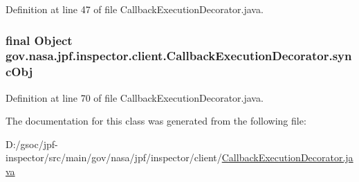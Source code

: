 Definition at line 47 of file Callback\+Execution\+Decorator.\+java.

\subsubsection[{\texorpdfstring{sync\+Obj}{syncObj}}]{\setlength{\rightskip}{0pt plus 5cm}final Object gov.\+nasa.\+jpf.\+inspector.\+client.\+Callback\+Execution\+Decorator.\+sync\+Obj\hspace{0.3cm}{\ttfamily [protected]}}\hypertarget{classgov_1_1nasa_1_1jpf_1_1inspector_1_1client_1_1_callback_execution_decorator_a44534c6f15095fc46c7e6cddc7e379da}{}\label{classgov_1_1nasa_1_1jpf_1_1inspector_1_1client_1_1_callback_execution_decorator_a44534c6f15095fc46c7e6cddc7e379da}


Definition at line 70 of file Callback\+Execution\+Decorator.\+java.



The documentation for this class was generated from the following file\+:\begin{DoxyCompactItemize}
\item 
D\+:/gsoc/jpf-\/inspector/src/main/gov/nasa/jpf/inspector/client/\hyperlink{_callback_execution_decorator_8java}{Callback\+Execution\+Decorator.\+java}\end{DoxyCompactItemize}

